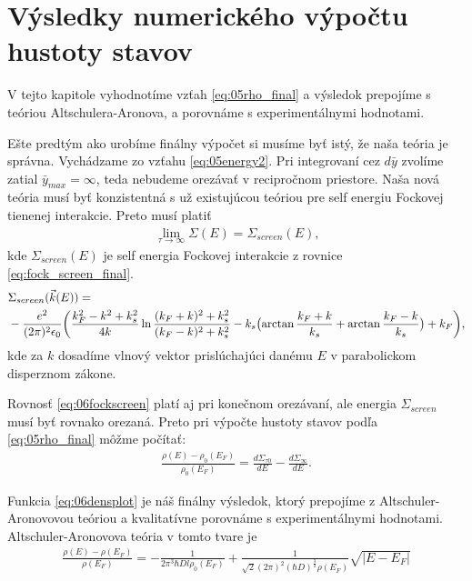\section{Výsledky numerického výpočtu hustoty stavov}
V tejto kapitole vyhodnotíme vzťah \eqref{eq:05rho_final} a výsledok prepojíme s teóriou Altschulera-Aronova, a porovnáme s experimentálnymi hodnotami. 

Ešte predtým ako urobíme finálny výpočet si musíme byť istý, že naša teória je správna. Vychádzame zo vzťahu \eqref{eq:05energy2}. Pri integrovaní cez $d\bar{y}$ zvolíme zatial $\bar{y}_{max}=\infty$, teda nebudeme orezávať v recipročnom priestore. Naša nová teória musí byť konzistentná s už existujúcou teóriou pre self energiu Fockovej tienenej interakcie. Preto musí platiť
\begin{align}
\label{eq:06consistency}
\lim_{\tau\to\infty}\Sigma(E) = \Sigma_{screen}(E) \text{,}
\end{align}
kde $\Sigma_{screen}(E)$ je self energia Fockovej interakcie z rovnice \eqref{eq:fock_screen_final}.
 \begin{align}
  \label{eq:06fockscreen}
  &\Sigma_{screen}(\vec{k}(E))= \\ \notag
  &-\frac{e^2}{(2\pi)^2\epsilon_0} \biggl(
    \frac{k_F^2-k^2+k_s^2}{4k} \ln{\frac{(k_F+k)^2+k_s^2}{(k_F-k)^2+k_s^2}}-k_s\bigl(\arctan{\frac{k_F+k}{k_s}}+\arctan{\frac{k_F-k}{k_s}}\bigr)+k_F\biggr) \text{,}
 \end{align}
 kde za $k$ dosadíme vlnový vektor prislúchajúci danému $E$ v parabolickom disperznom zákone.
 
 Rovnosť \eqref{eq:06fockscreen} platí aj pri konečnom orezávaní, ale energia $\Sigma_{screen}$ musí byť rovnako orezaná. Preto pri výpočte hustoty stavov podľa 
 \eqref{eq:05rho_final} môžme počítať:                                      
 \begin{align}
 \label{eq:06densplot}
\frac{\rho(E)-\rho_0(E_F)}{\rho_0(E_F)}=\frac{d\Sigma_{\tau0}}{dE}-\frac{d\Sigma_{\infty}}{dE} \text{.}
 \end{align}

Funkcia \eqref{eq:06densplot} je náš finálny výsledok, ktorý prepojíme z Altschuler-Aronovovou teóriou a kvalitatívne porovnáme s experimentálnymi hodnotami. 
Altschuler-Aronovova teória v tomto tvare je 
\begin{align}
\label{eq:06altschuler}
\frac{\rho(E)-\rho(E_F)}{\rho(E_F)}= -\frac{1}{2\pi^3\hbar D l \rho_0(E_F)}+\frac{1}{\sqrt{2}(2\pi)^2(\hbar D)^\frac{3}{2}\rho(E_F)}\sqrt{|E-E_F|}
\end{align}

